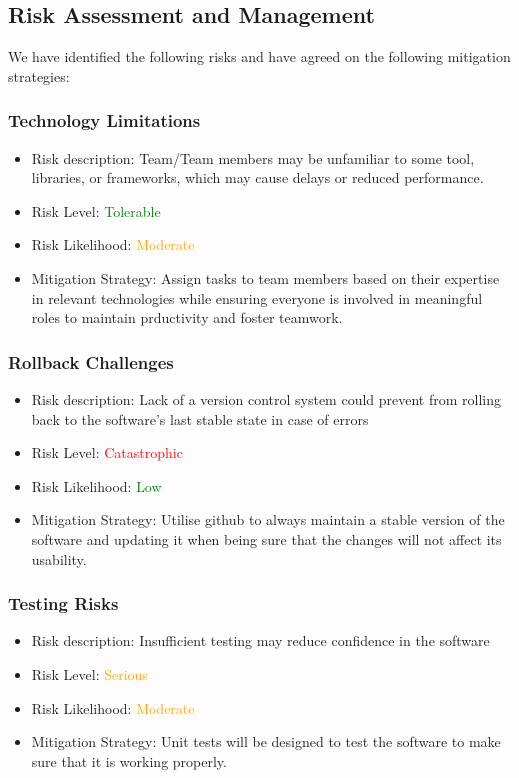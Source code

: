 \documentclass{article}
\begin{document}
\subsection{Risk Assessment and Management}
We have identified the following risks and have agreed on the following mitigation strategies:
\subsubsection{Technology Limitations}
\begin{itemize}
    \item Risk description: Team/Team members may be unfamiliar to some tool, libraries, or frameworks, which may cause delays or reduced performance. 
    \item Risk Level: \textcolor{green}{Tolerable}
    \item Risk Likelihood: \textcolor{orange}{Moderate}
    \item Mitigation Strategy: Assign tasks to team members based on their expertise in relevant technologies while ensuring everyone is involved in meaningful roles to maintain prductivity and foster teamwork.
\end{itemize}

\subsubsection{Rollback Challenges}
\begin{itemize}
    \item Risk description: Lack of a version control system could prevent from rolling back to the software's last stable state in case of errors
    \item Risk Level: \textcolor{red}{Catastrophic}
    \item Risk Likelihood: \textcolor{green}{Low}
    \item Mitigation Strategy: Utilise github to always maintain a stable version of the software and updating it when being sure that the changes will not affect its usability. 
\end{itemize}

\subsubsection{Testing Risks}
\begin{itemize}
    \item Risk description: Insufficient testing may reduce confidence in the software
    \item Risk Level: \textcolor{orange}{Serious}
    \item Risk Likelihood: \textcolor{orange}{Moderate}
    \item Mitigation Strategy: Unit tests will be designed to test the software to make sure that it is working properly.
\end{itemize}
\end{document}
